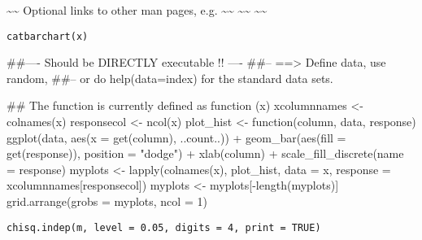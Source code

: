 \documentclass[letterpaper]{book}
\begin{document}
%
\begin{SeeAlso}\relax
\textasciitilde{}\textasciitilde{} Optional links to other man pages, e.g. \textasciitilde{}\textasciitilde{}
\textasciitilde{}\textasciitilde{}  \textasciitilde{}\textasciitilde{}
\end{SeeAlso}
%
\begin{Usage}
\begin{verbatim}
catbarchart(x)
\end{verbatim}
\end{Usage}
%
\begin{Arguments}
\begin{ldescription}
\item[\code{x}] 


\end{ldescription}
\end{Arguments}
%
\begin{Examples}
\begin{ExampleCode}
##---- Should be DIRECTLY executable !! ----
##-- ==>  Define data, use random,
##--	or do  help(data=index)  for the standard data sets.

## The function is currently defined as
function (x) 
{
    xcolumnnames <- colnames(x)
    responsecol <- ncol(x)
    plot_hist <- function(column, data, response) ggplot(data, 
        aes(x = get(column), ..count..)) + geom_bar(aes(fill = get(response)), 
        position = "dodge") + xlab(column) + scale_fill_discrete(name = response)
    myplots <- lapply(colnames(x), plot_hist, data = x, response = xcolumnnames[responsecol])
    myplots <- myplots[-length(myplots)]
    grid.arrange(grobs = myplots, ncol = 1)
  }
\end{ExampleCode}
\end{Examples}
%
\begin{Usage}
\begin{verbatim}
chisq.indep(m, level = 0.05, digits = 4, print = TRUE)
\end{verbatim}
\end{Usage}
%
\begin{Arguments}
\begin{ldescription}
\item[\code{m}] 


\item[\code{level}] 


\item[\code{digits}] 


\item[\code{print}] 


\end{ldescription}
\end{Arguments}
\end{document}
